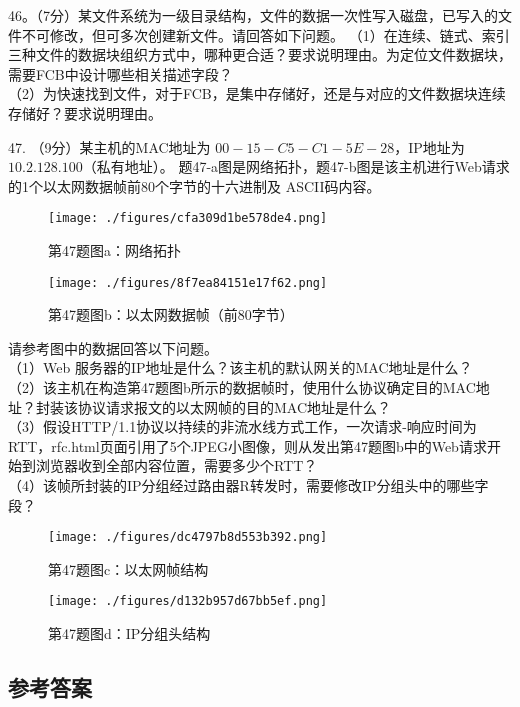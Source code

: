 46。（7分）某文件系统为一级目录结构，文件的数据一次性写入磁盘，已写入的文件不可修改，但可多次创建新文件。请回答如下问题。
（1）在连续、链式、索引三种文件的数据块组织方式中，哪种更合适？要求说明理由。为定位文件数据块，需要FCB中设计哪些相关描述字段？ \\
（2）为快速找到文件，对于FCB，是集中存储好，还是与对应的文件数据块连续存储好？要求说明理由。

47. （9分）某主机的MAC地址为 $00-15-C5-C1-5E-28$，IP地址为 $10.2.128.100$（私有地址）。 题47-a图是网络拓扑，题47-b图是该主机进行Web请求的1个以太网数据帧前80个字节的十六进制及 ASCII码内容。
\begin{figure}[ht]
\centering
\texttt{[image: ./figures/cfa309d1be578de4.png]}
\caption{第47题图a：网络拓扑} \label{fig_Na11_5}
\end{figure}

\begin{figure}[ht]
\centering
\texttt{[image: ./figures/8f7ea84151e17f62.png]}
\caption{第47题图b：以太网数据帧（前80字节）} \label{fig_Na11_6}
\end{figure}

请参考图中的数据回答以下问题。 \\
（1）Web 服务器的IP地址是什么？该主机的默认网关的MAC地址是什么？ \\
（2）该主机在构造第47题图b所示的数据帧时，使用什么协议确定目的MAC地址？封装该协议请求报文的以太网帧的目的MAC地址是什么？ \\
（3）假设HTTP/1.1协议以持续的非流水线方式工作，一次请求-响应时间为RTT，rfc.html页面引用了5个JPEG小图像，则从发出第47题图b中的Web请求开始到浏览器收到全部内容位置，需要多少个RTT？ \\
（4）该帧所封装的IP分组经过路由器R转发时，需要修改IP分组头中的哪些字段？ \\
\begin{figure}[ht]
\centering
\texttt{[image: ./figures/dc4797b8d553b392.png]}
\caption{第47题图c：以太网帧结构} \label{fig_Na11_7}
\end{figure}
\begin{figure}[ht]
\centering
\texttt{[image: ./figures/d132b957d67bb5ef.png]}
\caption{第47题图d：IP分组头结构} \label{fig_Na11_8}
\end{figure}




\subsection{参考答案}
